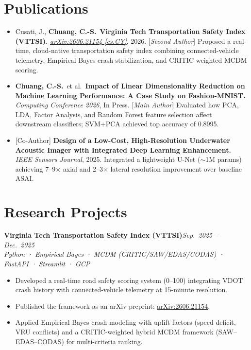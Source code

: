 \documentclass[10pt,letterpaper]{article}
\newcommand{\resumeItem}[1]{\item\small #1}
\newcommand{\entryHeaderSingle}[3]{%
  \noindent\textbf{#1}\hfill \textit{\small\color{muted}#2}\\
  {\small\textit{\color{muted}#3}}
  \vspace{1pt}
}
\begin{document}
\section{Publications}

\begin{itemize}[leftmargin=1.5em, itemsep=1pt, topsep=1pt]
  \resumeItem{Cusati, J., \textbf{Chuang, C.-S.}\ \textbf{Virginia Tech Transportation Safety Index (VTTSI).}
    \textit{\href{https://arxiv.org/abs/2606.21154}{arXiv:2606.21154 [cs.CY]}}, 2026.
    [\textit{Second Author}]
    Proposed a real-time, cloud-native transportation safety index combining connected-vehicle telemetry,
    Empirical Bayes crash stabilization, and CRITIC-weighted MCDM scoring.}

  \resumeItem{\textbf{Chuang, C.-S.}\ et al.\ \textbf{Impact of Linear Dimensionality Reduction on Machine Learning
    Performance: A Case Study on Fashion-MNIST.}
    \textit{Computing Conference 2026}, In Press.
    [\textit{Main Author}]
    Evaluated how PCA, LDA, Factor Analysis, and Random Forest feature selection affect downstream classifiers;
    SVM+PCA achieved top accuracy of 0.8995.}

  \resumeItem{[Co-Author] \textbf{Design of a Low-Cost, High-Resolution Underwater Acoustic Imager with
    Integrated Deep Learning Enhancement.}
    \textit{IEEE Sensors Journal}, 2025.
    Integrated a lightweight U-Net (${\sim}$1M params) achieving 7--9$\times$ axial and
    2--3$\times$ lateral resolution improvement over baseline ASAI.}
\end{itemize}

\section{Research Projects}

\entryHeaderSingle{Virginia Tech Transportation Safety Index (VTTSI)}{Sep.~2025 -- Dec.~2025}
                  {Python · Empirical Bayes · MCDM (CRITIC/SAW/EDAS/CODAS) · FastAPI · Streamlit · GCP}
\begin{itemize}[leftmargin=1.5em, itemsep=0pt, topsep=1pt]
  \resumeItem{Developed a real-time road safety scoring system (0--100) integrating VDOT crash history
    with connected-vehicle telemetry at 15-minute resolution.}
  \resumeItem{Published the framework as an arXiv preprint:
    \href{https://arxiv.org/abs/2606.21154}{arXiv:2606.21154}.}
  \resumeItem{Applied Empirical Bayes crash modeling with uplift factors (speed deficit, VRU conflicts)
    and a CRITIC-weighted hybrid MCDM framework (SAW--EDAS--CODAS) for multi-criteria ranking.}
\end{itemize}
\vspace{1pt}
\end{document}
